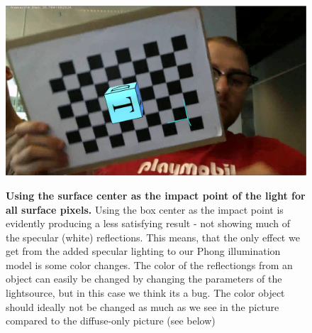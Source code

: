 \begin{figure}[H]
    \includegraphics{pics/boxCenterLightVector.png}
    \label{fig:BoxCenter}
    \caption{\textbf{Using the surface center as the impact point of the light for all surface pixels.} Using the box center as the impact point is evidently producing a less satisfying result - not showing much of the specular (white) reflections. This means, that the only effect we get from the added specular lighting to our Phong illumination model is some color changes. The color of the reflectiongs from an object can easily be changed by changing the parameters of the lightsource, but in this case we think its a bug. The color object should ideally not be changed as much as we see in the picture compared to the diffuse-only picture (see below)}
\end{figure}



